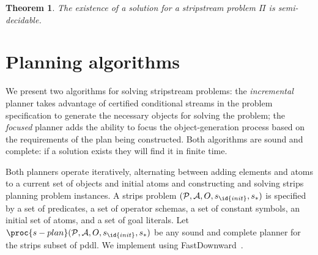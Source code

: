 \documentclass[letterpaper]{article} %
\newcommand\note[1]{\todo[inline, color=blue!10, linecolor=blue!90,
  size=\footnotesize]{\linespread{0.9}\selectfont{{\bf CRG:} #1}\par}}
\theoremstyle{plain}\newtheorem{thm}{Theorem}
\theoremstyle{definition}\newtheorem{defn}{Definition}
\theoremstyle{plain}\newtheorem{lem}{Lemma}
\theoremstyle{plain}\newtheorem{cor}{Corollary}
\newcommand{\algname}{{\sc strips}tream}
\newcommand{\strips}{{\sc strips}}
\newcommand{\pddl}{{\sc pddl}}
\newcommand{\eager}{incremental}
\begin{document}
\begin{thm}\label{thm:decide}
The existence of a solution for a \algname{} problem $\Pi$ is
semi-decidable. 
\end{thm}


\section{Planning algorithms}
We present two algorithms for solving \algname{} problems:  the {\em
  \eager{}} planner takes advantage of certified conditional streams in
the problem specification to generate the necessary objects for solving
the problem;  the {\em focused} planner adds the ability to focus the
object-generation process based on the requirements of the plan being
constructed.  Both algorithms are sound and complete: if a solution
exists they will find it in finite time.

Both planners operate iteratively, alternating between adding elements
and atoms to a current set of objects and initial atoms and constructing and
solving \strips{} planning problem instances. 
A \strips{} problem $({\cal P}, {\cal
  A}, O, s_\id{init}, s_*)$ is specified by a set of predicates, a set of
operator schemas, a set of constant symbols, an initial set of
atoms, and a set of goal literals.  
Let $\proc{s-plan}({\cal P}, {\cal A}, O, s_\id{init}, s_*)$ be any sound and complete
planner for the \strips{} subset of \pddl{}.
We implement  using FastDownward~\cite{helmert2006fast}.
\end{document}
